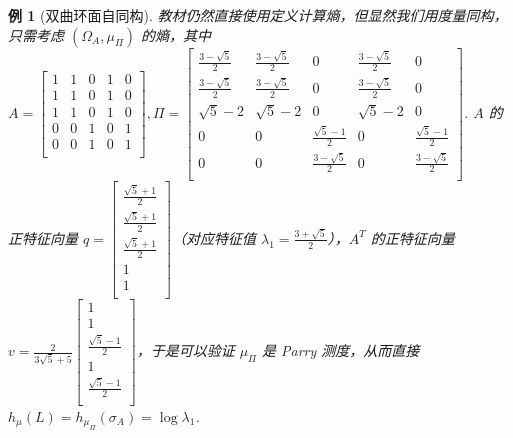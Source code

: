 \documentclass[11pt, a4paper, oneside]{ctexart}
\newtheorem{example}[theorem]{例}
\begin{document}
    \begin{example}[双曲环面自同构]
        教材仍然直接使用定义计算熵，但显然我们用度量同构，只需考虑 $(\Omega_A,\mu_{\Pi})$ 的熵，其中 $A=\begin{bmatrix}
            1&1&0&1&0\\
            1&1&0&1&0\\
            1&1&0&1&0\\
            0&0&1&0&1\\
            0&0&1&0&1\\
        \end{bmatrix},\Pi=\begin{bmatrix}
            \frac{3-\sqrt{5}}{2}&\frac{3-\sqrt{5}}{2}&0&\frac{3-\sqrt{5}}{2}&0\\
            \frac{3-\sqrt{5}}{2}&\frac{3-\sqrt{5}}{2}&0&\frac{3-\sqrt{5}}{2}&0\\
            \sqrt{5}-2&\sqrt{5}-2&0&\sqrt{5}-2&0\\
            0&0&\frac{\sqrt{5}-1}{2}&0&\frac{\sqrt{5}-1}{2}\\
            0&0&\frac{3-\sqrt{5}}{2}&0&\frac{3-\sqrt{5}}{2}\\
        \end{bmatrix}$. $A$ 的正特征向量 $q=\begin{bmatrix}
            \frac{\sqrt{5}+1}{2}\\
            \frac{\sqrt{5}+1}{2}\\
            \frac{\sqrt{5}+1}{2}\\
            1\\
            1\\
        \end{bmatrix}$（对应特征值 $\lambda_1=\frac{3+\sqrt{5}}{2}$），$A^T$ 的正特征向量 $v=\frac{2}{3\sqrt{5}+5}\begin{bmatrix}
            1\\
            1\\
            \frac{\sqrt{5}-1}{2}\\
            1\\
            \frac{\sqrt{5}-1}{2}\\
        \end{bmatrix}$，于是可以验证 $\mu_{\Pi}$ 是 Parry 测度，从而直接 $h_{\mu}(L)=h_{\mu_{\Pi}}(\sigma_A)=\log\lambda_1$.
    \end{example}
\end{document}
